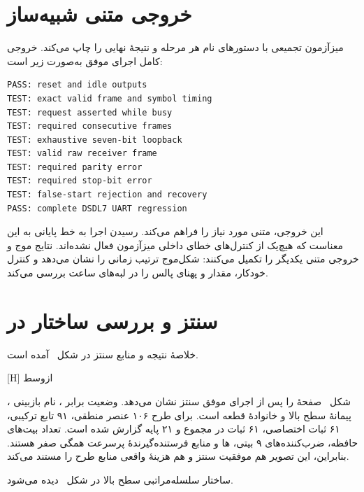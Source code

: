 \section{خروجی متنی شبیه‌ساز}

میزآزمون تجمیعی با دستورهای  نام هر مرحله و نتیجهٔ نهایی را چاپ می‌کند.
خروجی کامل اجرای موفق به‌صورت زیر است:

\begin{dsdlcodeblock}
\begin{verbatim}
PASS: reset and idle outputs
TEST: exact valid frame and symbol timing
TEST: request asserted while busy
TEST: required consecutive frames
TEST: exhaustive seven-bit loopback
TEST: valid raw receiver frame
TEST: required parity error
TEST: required stop-bit error
TEST: false-start rejection and recovery
PASS: complete DSDL7 UART regression
\end{verbatim}
\end{dsdlcodeblock}

این خروجی،  متنی مورد نیاز را فراهم می‌کند. رسیدن اجرا به خط پایانی
 به این معناست که هیچ‌یک از کنترل‌های خطای داخلی میزآزمون فعال نشده‌اند. نتایج
موج و خروجی متنی یکدیگر را تکمیل می‌کنند: شکل‌موج ترتیب زمانی را نشان می‌دهد و کنترل
خودکار، مقدار و پهنای پالس را در لبه‌های ساعت بررسی می‌کند.


\section{سنتز و بررسی ساختار در }

خلاصهٔ نتیجه و منابع سنتز در شکل~ آمده است.

[H]
‌ازوسط

شکل~ صفحهٔ  را پس از
اجرای موفق سنتز نشان می‌دهد. وضعیت  برابر
، نام بازبینی ، پیمانهٔ سطح بالا  و خانوادهٔ قطعه
 است. برای طرح ۱۰۶ عنصر منطقی، ۹۱ تابع ترکیبی، ۶۱ ثبات اختصاصی،
۶۱ ثبات در مجموع و ۲۱ پایه گزارش شده است. تعداد بیت‌های حافظه، ضرب‌کننده‌های ۹ بیتی،
ها و منابع فرستنده‌گیرندهٔ پرسرعت همگی صفر هستند. بنابراین، این
تصویر هم موفقیت سنتز و هم هزینهٔ واقعی منابع طرح را مستند می‌کند.

ساختار سلسله‌مراتبی سطح بالا در شکل~ دیده می‌شود.

